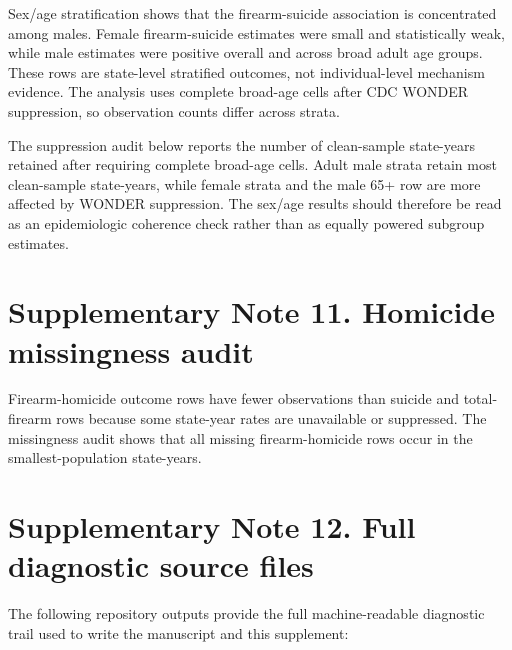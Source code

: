\documentclass[10pt]{article}
\begin{document}




Sex/age stratification shows that the firearm-suicide association is concentrated among males. Female firearm-suicide estimates were small and statistically weak, while male estimates were positive overall and across broad adult age groups. These rows are state-level stratified outcomes, not individual-level mechanism evidence. The analysis uses complete broad-age cells after CDC WONDER suppression, so observation counts differ across strata.



The suppression audit below reports the number of clean-sample state-years retained after requiring complete broad-age cells. Adult male strata retain most clean-sample state-years, while female strata and the male 65+ row are more affected by WONDER suppression. The sex/age results should therefore be read as an epidemiologic coherence check rather than as equally powered subgroup estimates.



\section*{Supplementary Note 11. Homicide missingness audit}

Firearm-homicide outcome rows have fewer observations than suicide and total-firearm rows because some state-year rates are unavailable or suppressed. The missingness audit shows that all missing firearm-homicide rows occur in the smallest-population state-years.





\section*{Supplementary Note 12. Full diagnostic source files}

The following repository outputs provide the full machine-readable diagnostic trail used to write the manuscript and this supplement:
\end{document}
